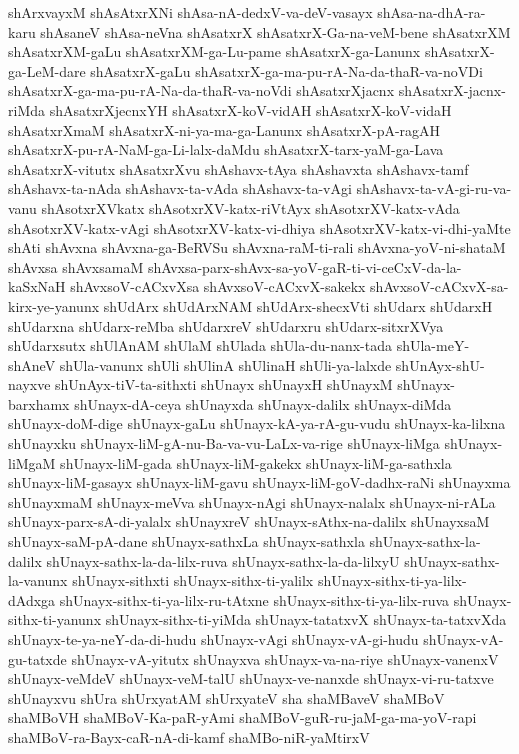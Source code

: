 {shArxvayxM
shAsAtxrXNi
shAsa-nA-dedxV-va-deV-vasayx
shAsa-na-dhA-ra-karu
shAsaneV
shAsa-neVna
shAsatxrX
shAsatxrX-Ga-na-veM-bene
shAsatxrXM
shAsatxrXM-gaLu
shAsatxrXM-ga-Lu-pame
shAsatxrX-ga-Lanunx
shAsatxrX-ga-LeM-dare
shAsatxrX-gaLu
shAsatxrX-ga-ma-pu-rA-Na-da-thaR-va-noVDi
shAsatxrX-ga-ma-pu-rA-Na-da-thaR-va-noVdi
shAsatxrXjacnx
shAsatxrX-jacnx-riMda
shAsatxrXjecnxYH
shAsatxrX-koV-vidAH
shAsatxrX-koV-vidaH
shAsatxrXmaM
shAsatxrX-ni-ya-ma-ga-Lanunx
shAsatxrX-pA-ragAH
shAsatxrX-pu-rA-NaM-ga-Li-lalx-daMdu
shAsatxrX-tarx-yaM-ga-Lava
shAsatxrX-vitutx
shAsatxrXvu
shAshavx-tAya
shAshavxta
shAshavx-tamf
shAshavx-ta-nAda
shAshavx-ta-vAda
shAshavx-ta-vAgi
shAshavx-ta-vA-gi-ru-va-vanu
shAsotxrXVkatx
shAsotxrXV-katx-riVtAyx
shAsotxrXV-katx-vAda
shAsotxrXV-katx-vAgi
shAsotxrXV-katx-vi-dhiya
shAsotxrXV-katx-vi-dhi-yaMte
shAti
shAvxna
shAvxna-ga-BeRVSu
shAvxna-raM-ti-rali
shAvxna-yoV-ni-shataM
shAvxsa
shAvxsamaM
shAvxsa-parx-shAvx-sa-yoV-gaR-ti-vi-ceCxV-da-la-kaSxNaH
shAvxsoV-cACxvXsa
shAvxsoV-cACxvX-sakekx
shAvxsoV-cACxvX-sa-kirx-ye-yanunx
shUdArx
shUdArxNAM
shUdArx-shecxVti
shUdarx
shUdarxH
shUdarxna
shUdarx-reMba
shUdarxreV
shUdarxru
shUdarx-sitxrXVya
shUdarxsutx
shUlAnAM
shUlaM
shUlada
shUla-du-nanx-tada
shUla-meY-shAneV
shUla-vanunx
shUli
shUlinA
shUlinaH
shUli-ya-lalxde
shUnAyx-shU-nayxve
shUnAyx-tiV-ta-sithxti
shUnayx
shUnayxH
shUnayxM
shUnayx-barxhamx
shUnayx-dA-ceya
shUnayxda
shUnayx-dalilx
shUnayx-diMda
shUnayx-doM-dige
shUnayx-gaLu
shUnayx-kA-ya-rA-gu-vudu
shUnayx-ka-lilxna
shUnayxku
shUnayx-liM-gA-nu-Ba-va-vu-LaLx-va-rige
shUnayx-liMga
shUnayx-liMgaM
shUnayx-liM-gada
shUnayx-liM-gakekx
shUnayx-liM-ga-sathxla
shUnayx-liM-gasayx
shUnayx-liM-gavu
shUnayx-liM-goV-dadhx-raNi
shUnayxma
shUnayxmaM
shUnayx-meVva
shUnayx-nAgi
shUnayx-nalalx
shUnayx-ni-rALa
shUnayx-parx-sA-di-yalalx
shUnayxreV
shUnayx-sAthx-na-dalilx
shUnayxsaM
shUnayx-saM-pA-dane
shUnayx-sathxLa
shUnayx-sathxla
shUnayx-sathx-la-dalilx
shUnayx-sathx-la-da-lilx-ruva
shUnayx-sathx-la-da-lilxyU
shUnayx-sathx-la-vanunx
shUnayx-sithxti
shUnayx-sithx-ti-yalilx
shUnayx-sithx-ti-ya-lilx-dAdxga
shUnayx-sithx-ti-ya-lilx-ru-tAtxne
shUnayx-sithx-ti-ya-lilx-ruva
shUnayx-sithx-ti-yanunx
shUnayx-sithx-ti-yiMda
shUnayx-tatatxvX
shUnayx-ta-tatxvXda
shUnayx-te-ya-neY-da-di-hudu
shUnayx-vAgi
shUnayx-vA-gi-hudu
shUnayx-vA-gu-tatxde
shUnayx-vA-yitutx
shUnayxva
shUnayx-va-na-riye
shUnayx-vanenxV
shUnayx-veMdeV
shUnayx-veM-talU
shUnayx-ve-nanxde
shUnayx-vi-ru-tatxve
shUnayxvu
shUra
shUrxyatAM
shUrxyateV
sha
shaMBaveV
shaMBoV
shaMBoVH
shaMBoV-Ka-paR-yAmi
shaMBoV-guR-ru-jaM-ga-ma-yoV-rapi
shaMBoV-ra-Bayx-caR-nA-di-kamf
shaMBo-niR-yaMtirxV
}
